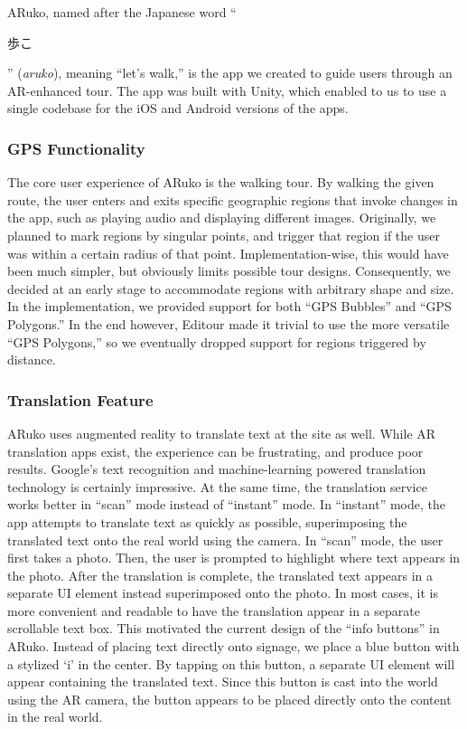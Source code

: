 \documentclass[a4paper, 10pt, american, titlepage]{article}
\begin{document}
ARuko, named after the Japanese word ``\begin{CJK}{UTF8}{min}歩こ\end{CJK}''
(\textit{aruko}), meaning ``let's walk,'' is the app we created to guide users
through an AR-enhanced tour. The app was built with Unity, which enabled to us
to use a single codebase for the iOS and Android versions of the apps.

\subsubsection{GPS Functionality}
\label{sec:gpsFunctionality}

The core user experience of ARuko is the walking tour. By walking the given
route, the user enters and exits specific geographic regions that invoke
changes in the app, such as playing audio and displaying different images.
Originally, we planned to mark regions by singular points, and trigger that
region if the user was within a certain radius of that point.
Implementation-wise, this would have been much simpler, but obviously limits
possible tour designs. Consequently, we decided at an early stage to
accommodate regions with arbitrary shape and size.  In the implementation, we
provided support for both ``GPS Bubbles'' and ``GPS Polygons.'' In the end
however, Editour made it trivial to use the more versatile ``GPS Polygons,'' so
we eventually dropped support for regions triggered by distance.

\subsubsection{Translation Feature}
\label{sec:translationFeature}

ARuko uses augmented reality to translate text at the site as well. While AR
translation apps exist, the experience can be frustrating, and produce poor
results. Google's text recognition and machine-learning powered translation
technology is certainly impressive. At the same time, the translation service
works better in ``scan'' mode instead of ``instant'' mode. In ``instant'' mode,
the app attempts to translate text as quickly as possible, superimposing the
translated text onto the real world using the camera. In ``scan'' mode, the user
first takes a photo. Then, the user is prompted to highlight where text appears
in the photo. After the translation is complete, the translated text appears in
a separate UI element instead superimposed onto the photo. In most cases, it is
more convenient and readable to have the translation appear in a separate
scrollable text box. This motivated the current design of the ``info buttons''
in ARuko. Instead of placing text directly onto signage, we place a blue button
with a stylized `i' in the center. By tapping on this button, a separate UI
element will appear containing the translated text. Since this button is cast
into the world using the AR camera, the button appears to be placed directly
onto the content in the real world.
\end{document}
